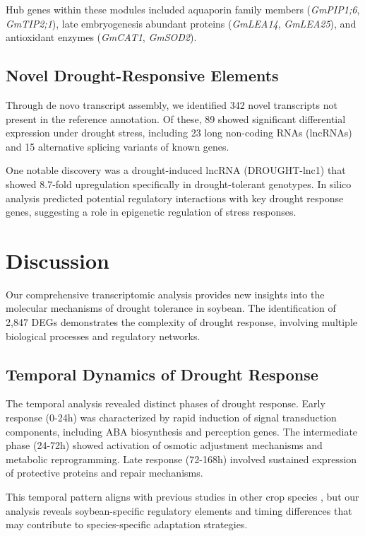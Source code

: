 \documentclass[11pt,a4paper]{article}
\begin{document}
Hub genes within these modules included aquaporin family members (\textit{GmPIP1;6}, \textit{GmTIP2;1}), late embryogenesis abundant proteins (\textit{GmLEA14}, \textit{GmLEA25}), and antioxidant enzymes (\textit{GmCAT1}, \textit{GmSOD2}).

\subsection{Novel Drought-Responsive Elements}

Through de novo transcript assembly, we identified 342 novel transcripts not present in the reference annotation. Of these, 89 showed significant differential expression under drought stress, including 23 long non-coding RNAs (lncRNAs) and 15 alternative splicing variants of known genes.

One notable discovery was a drought-induced lncRNA (DROUGHT-lnc1) that showed 8.7-fold upregulation specifically in drought-tolerant genotypes. In silico analysis predicted potential regulatory interactions with key drought response genes, suggesting a role in epigenetic regulation of stress responses.

\section{Discussion}

Our comprehensive transcriptomic analysis provides new insights into the molecular mechanisms of drought tolerance in soybean. The identification of 2,847 DEGs demonstrates the complexity of drought response, involving multiple biological processes and regulatory networks.

\subsection{Temporal Dynamics of Drought Response}

The temporal analysis revealed distinct phases of drought response. Early response (0-24h) was characterized by rapid induction of signal transduction components, including ABA biosynthesis and perception genes. The intermediate phase (24-72h) showed activation of osmotic adjustment mechanisms and metabolic reprogramming. Late response (72-168h) involved sustained expression of protective proteins and repair mechanisms.

This temporal pattern aligns with previous studies in other crop species \citep{Deeba2012}, but our analysis reveals soybean-specific regulatory elements and timing differences that may contribute to species-specific adaptation strategies.
\end{document}
